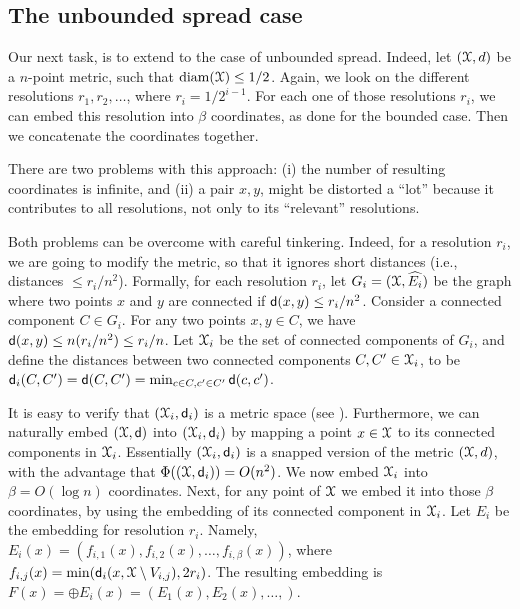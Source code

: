 \subsection{The unbounded spread case}

Our next task, is to extend  to the case
of unbounded spread. Indeed, let $(\FMS,d)$ be a $n$-point metric, such
that $\diam(\FMS) \leq 1/2$. Again, we look on the different resolutions
$r_1, r_2, \ldots$, where $r_i = 1/2^{i-1}$. For each one of those
resolutions $r_i$, we can embed this resolution into $\beta$
coordinates, as done for the bounded case. Then we concatenate the
coordinates together.

There are two problems with this approach: (i) the number of resulting
coordinates is infinite, and (ii) a pair $x,y$, might be distorted a
``lot'' because it contributes to all resolutions, not only to its
``relevant'' resolutions.

Both problems can be overcome with careful tinkering. Indeed, for a
resolution $r_i$, we are going to modify the metric, so that it
ignores short distances (i.e., distances $\leq r_i/n^2$).  Formally,
for each resolution $r_i$, let $G_i =(\FMS,\widehat{E_i})$ be the
graph where two points $x$ and $y$ are connected if $\mathsf{d}(x,y) \leq
r_i/n^2$.  Consider a connected component $C \in G_i$. For any two
points $x, y \in C$, we have $\mathsf{d}(x,y) \leq n( r_i/n^2 ) \leq
r_i/n$. Let $\FMS_i$ be the set of connected components of $G_i$, and
define the distances between two connected components $C, C' \in
\FMS_i$, to be $\mathsf{d}_i(C, C') = \mathsf{d}(C, C') = \min_{c \in C, c' \in
   C'} \mathsf{d}(c, c')$.

It is easy to verify that $(\FMS_i, \DistChar_i)$ is a metric space (see
).  Furthermore, we can naturally
embed $(\FMS,\DistChar)$ into $(\FMS_i, \DistChar_i)$ by mapping a point $x
\in \FMS$ to its connected components in $\FMS_i$.  Essentially
$(\FMS_i,\DistChar_i)$ is a snapped version of the metric $(\FMS,d)$, with
the advantage that $\Spread\pth{ (\FMS, \DistChar_i) } = O(n^2)$. We now
embed $\FMS_i$ into $\beta = O(\log n)$ coordinates. Next, for any
point of $\FMS$ we embed it into those $\beta$ coordinates, by using
the embedding of its connected component in $\FMS_i$. Let $E_i$ be the
embedding for resolution $r_i$.  Namely, $E_i(x) = (f_{i,1}(x),
f_{i,2}(x), \ldots, f_{i,\beta}(x))$, where $f_{i,j}(x) = \min(
\DistChar_i(x, \FMS \setminus V_{i,j}), 2r_i )$.  The resulting embedding
is $F(x) = \oplus E_i(x) = (E_1(x), E_2(x), \ldots, )$.

